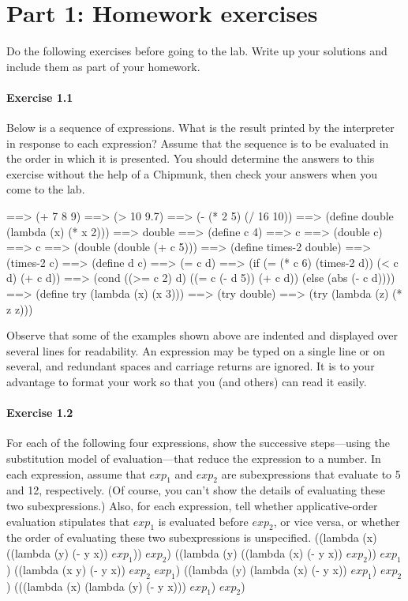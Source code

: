 \section{Part 1: Homework exercises}

Do the following exercises before going to the lab.  Write up your
solutions and include them as part of your homework.

\paragraph{Exercise 1.1}
Below is a sequence of expressions.  What is the result printed by the
interpreter in response to each expression?  Assume that the sequence
is to be evaluated in the order in which it is presented.  You should
determine the answers to this exercise without the help of a Chipmunk,
then check your answers when you come to the lab.

\beginlisp
==> (+ 7 8 9)
\null
==> (> 10 9.7)
\null
==> (- (* 2 5) (/ 16 10))
\null
==> (define double (lambda (x) (* x 2)))
\null
==> double
\null
==> (define c 4)
\null
==> c
\null
==> (double c)
\null
==> c
\null
==> (double (double (+ c 5)))
\null
==> (define times-2 double)
\null
==> (times-2 c)
\null
==> (define d c)
\null
==> (= c d)
\null
==> (if (= (* c 6) (times-2 d))
        (< c d)
        (+ c d))
\null
==> (cond ((>= c 2) d)
          ((= c (- d 5)) (+ c d))
          (else (abs (- c d))))
\null
==> (define try (lambda (x) (x 3)))
\null
==> (try double)
\null
==> (try (lambda (z) (* z z)))
\endlisp

Observe that some of the examples shown above are indented and
displayed over several lines for readability.  An expression may be
typed on a single line or on several, and redundant spaces and
carriage returns are ignored.  It is to your advantage to format your
work so that you (and others) can read it easily.

\paragraph{Exercise 1.2}
For each of the following four expressions, show the successive
steps---using the substitution model of evaluation---that reduce the
expression to a number.  In each expression, assume that $exp_1$
and $exp_2$ are subexpressions that evaluate to 5 and 12,
respectively.  (Of course, you can't show the details of evaluating
these two subexpressions.)  Also, for each expression, tell whether
applicative-order evaluation stipulates that $exp_1$ is evaluated
before $exp_2$, or vice versa, or whether the order of evaluating
these two subexpressions is unspecified.
\beginlisp
((lambda (x) ((lambda (y) (- y x)) $exp_1$)) $exp_2$)
\null
((lambda (y) ((lambda (x) (- y x)) $exp_2$)) $exp_1$)
\null
((lambda (x y) (- y x)) $exp_2$ $exp_1$)
\null
((lambda (y) (lambda (x) (- y x)) $exp_1$) $exp_2$)
\null
(((lambda (x) (lambda (y) (- y x))) $exp_1$) $exp_2$)
\endlisp

